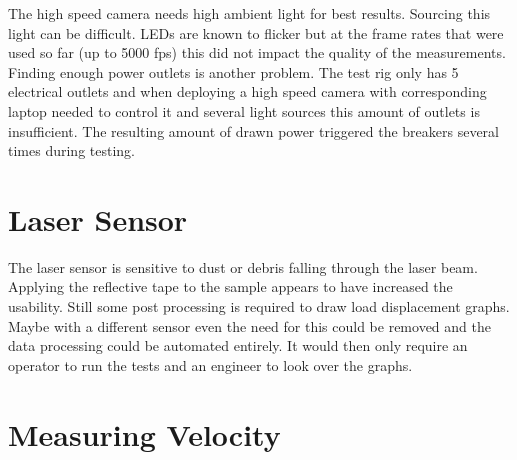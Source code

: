 The high speed camera needs high ambient light for best results. Sourcing this light can be difficult. LEDs are known to flicker but at the frame rates that were used so far (up to 5000 fps) this did not impact the quality of the measurements.
Finding enough power outlets is another problem. The test rig only has 5 electrical outlets and when deploying a high speed camera with corresponding laptop needed to control it and several light sources this amount of outlets is insufficient. The resulting amount of drawn power triggered the breakers several times during testing.

\section{Laser Sensor}


The laser sensor is sensitive to dust or debris falling through the laser beam. Applying the reflective tape to the sample appears to have increased the usability. Still some post processing is required to draw load displacement graphs. Maybe with a different sensor even the need for this could be removed and the data processing could be automated entirely. It would then only require an operator to run the tests and an engineer to look over the graphs. %


\section{Measuring Velocity}

